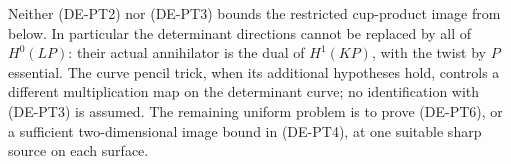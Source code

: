 \begin{remark}
\label{rem:DE-A3-positive-Petri-radical-scope-note}
Neither (DE-PT2) nor (DE-PT3) bounds the restricted cup-product
image from below. In particular the determinant directions cannot
be replaced by all of $H^0(LP)$: their actual annihilator is the
dual of $H^1(KP)$, with the twist by $P$ essential.
The curve pencil trick, when its additional hypotheses hold, controls
a different multiplication map on the determinant curve; no
identification with (DE-PT3) is assumed. The remaining uniform
problem is to prove (DE-PT6), or a sufficient two-dimensional image
bound in (DE-PT4), at one suitable sharp source on each surface.
\end{remark}
